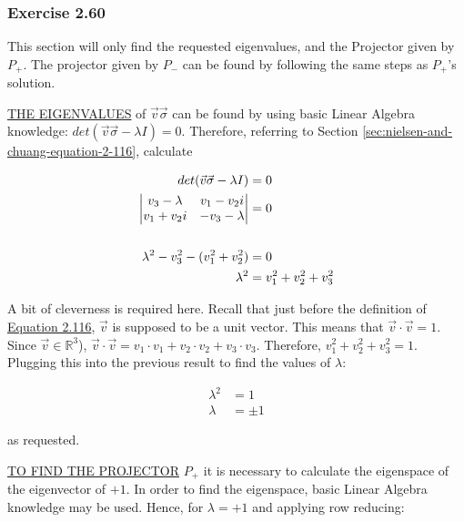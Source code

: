 \subsubsection{Exercise 2.60}
\label{sec:nielsen-and-chuang-exercise-2-60}
This section will only find the requested eigenvalues,
and the Projector given by $P_+$.
The projector given by $P_-$ can be found by following the same
steps as $P_+$'s solution.

\MakeUppercase{\underline{The eigenvalues}} of
$\vec{v} \vec{\sigma}$ can be found by using
basic Linear Algebra knowledge:
$det(\vec{v} \vec{\sigma} - \lambda I) = 0$.
Therefore, referring to Section \ref{sec:nielsen-and-chuang-equation-2-116},
calculate

\begin{align}
    det(\vec{v} \vec{\sigma} - \lambda I) &= 0 \\
    \left| \begin{matrix}
        v_3 - \lambda & v_1 - v_2i \\ v_1 + v_2i & -v_3 - \lambda
        \end{matrix} \right| &= 0 \\
    \notag \\
    \lambda^2 - v_3^2 - (v_1^2 + v_2^2) &= 0 \\
    \lambda^2 &= v_1^2 + v_2^2 + v_3^2
\end{align}

A bit of cleverness is required here.
Recall that just before the definition of
\hyperref[sec:nielsen-and-chuang-equation-2-116]{Equation 2.116},
$\vec{v}$ is supposed to be a unit vector.
This means that $\vec{v} \cdot \vec{v} = 1$.
Since $\vec{v} \in \mathbb{R}^3$),
$\vec{v} \cdot \vec{v} = v_1 \cdot v_1 +
v_2 \cdot v_2 + v_3 \cdot v_3$.
Therefore, $v_1^2 + v_2^2 + v_3^2 = 1$.
Plugging this into the previous result to find the values of $\lambda$:

\begin{align}
    \lambda^2 &= 1 \\
    \lambda &= \pm 1
\end{align}

as requested.

\MakeUppercase{\underline{To find the Projector}} $P_+$ it is necessary to
calculate the eigenspace of the eigenvector of $+1$.
In order to find the eigenspace, basic Linear Algebra knowledge may be used.
Hence, for $\lambda = +1$ and applying row reducing:

